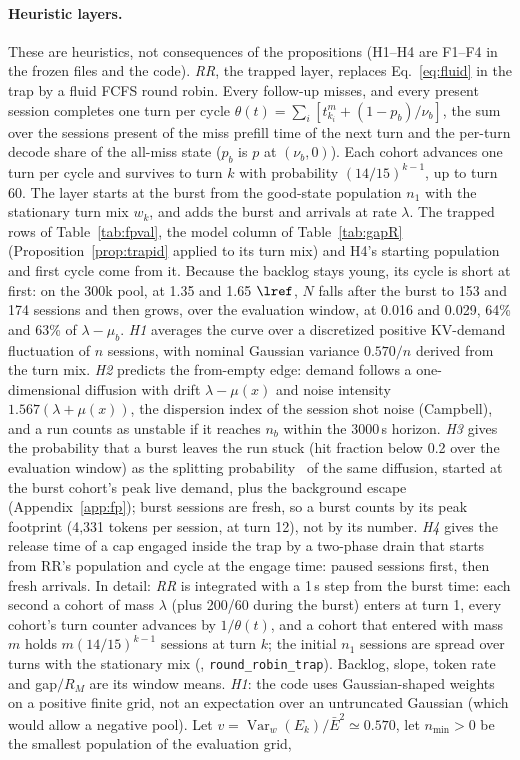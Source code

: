 \paragraph{Heuristic layers.} These are heuristics, not consequences of the propositions (H1--H4 are F1--F4 in the frozen files and the code). \emph{RR}, the trapped layer, replaces Eq.~\eqref{eq:fluid} in the trap by a fluid FCFS round robin. Every follow-up misses, and every present session completes one turn per cycle $\theta(t)=\sum_i[t^m_{k_i}+(1-p_b)/\nu_b]$, the sum over the sessions present of the miss prefill time of the next turn and the per-turn decode share of the all-miss state ($p_b$ is $p$ at $(\nu_b,0)$). Each cohort advances one turn per cycle and survives to turn $k$ with probability $(14/15)^{k-1}$, up to turn 60. The layer starts at the burst from the good-state population $n_1$ with the stationary turn mix $w_k$, and adds the burst and arrivals at rate $\lambda$. The trapped rows of Table~\ref{tab:fpval}, the model column of Table~\ref{tab:gapR} (Proposition~\ref{prop:trapid} applied to its turn mix) and H4's starting population and first cycle come from it. Because the backlog stays young, its cycle is short at first: on the 300k pool, at 1.35 and 1.65 $\lref$, $N$ falls after the burst to 153 and 174 sessions and then grows, over the evaluation window, at 0.016 and 0.029\sps, 64\% and 63\% of $\lambda-\mu_b$. \emph{H1} averages the curve over a discretized positive KV-demand fluctuation of $n$ sessions, with nominal Gaussian variance $0.570/n$ derived from the turn mix. \emph{H2} predicts the from-empty edge: demand follows a one-dimensional diffusion with drift $\lambda-\mu(x)$ and noise intensity $1.567(\lambda+\mu(x))$, the dispersion index of the session shot noise (Campbell), and a run counts as unstable if it reaches $n_b$ within the 3000\,s horizon. \emph{H3} gives the probability that a burst leaves the run stuck (hit fraction below 0.2 over the evaluation window) as the splitting probability~\citep{karlin1981second} of the same diffusion, started at the burst cohort's peak live demand, plus the background escape (Appendix~\ref{app:fp}); burst sessions are fresh, so a burst counts by its peak footprint (4,331 tokens per session, at turn 12), not by its number. \emph{H4} gives the release time of a cap engaged inside the trap by a two-phase drain that starts from RR's population and cycle at the engage time: paused sessions first, then fresh arrivals. In detail: \emph{RR} is integrated with a 1\,s step from the burst time: each second a cohort of mass $\lambda$ (plus 200/60 during the burst) enters at turn 1, every cohort's turn counter advances by $1/\theta(t)$, and a cohort that entered with mass $m$ holds $m(14/15)^{k-1}$ sessions at turn $k$; the initial $n_1$ sessions are spread over turns with the stationary mix (, \texttt{round\_robin\_trap}). Backlog, slope, token rate and gap$/R_M$ are its window means. \emph{H1}: the code uses Gaussian-shaped weights on a positive finite grid, not an expectation over an untruncated Gaussian (which would allow a negative pool). Let $v=\operatorname{Var}_w(E_k)/\bar E^2\simeq0.570$, let $n_{\min}>0$ be the smallest population of the evaluation grid, 